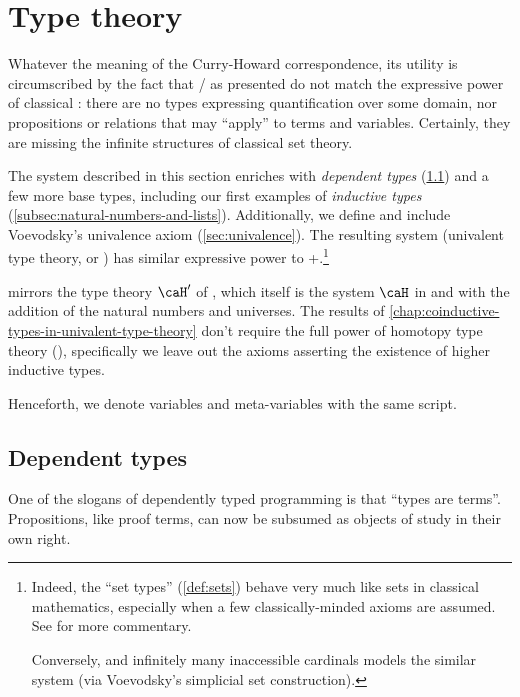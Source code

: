 \documentclass[./thesis.tex]{subfiles}
\begin{document}
\chapter{Type theory}
\label{chap:type-theory}

Whatever the meaning of the Curry-Howard correspondence, its utility is
circumscribed by the fact that \IPL{}/\TLC{} as
presented do not match the expressive power of classical \FOL{}:
there are no types expressing quantification over some domain, nor propositions
or relations that may ``apply'' to terms and variables. Certainly, they are
missing the infinite structures of classical set theory.

The system described in this section enriches \TLC{} with
\textit{dependent types} (\cref{sec:dependent-types}) and a few more base types,
including our first examples of \textit{inductive types}
(\cref{subsec:natural-numbers-and-lists}). Additionally, we define and include
Voevodsky's univalence axiom (\cref{sec:univalence}). The
resulting system (univalent type theory, or \UTT{}) has similar
expressive power to \ZFC{}+\FOL{}.\footnote{Indeed, the
  ``set types'' (\cref{def:sets}) behave very much like sets in classical
  mathematics, especially when a few classically-minded axioms are assumed. See
  \cite{book} for more commentary.

  Conversely, \ZFC{} and infinitely many inaccessible cardinals models the
  similar system \HoTT{} (via Voevodsky's simplicial set construction).}

\UTT{} mirrors the type theory $\caH'$ of \cite{homotopy-limits}, which itself
is the system $\caH$ in \cite{inductive} and \cite{homotopy-initial} with the
addition of the natural numbers and universes. The results of
\cref{chap:coinductive-types-in-univalent-type-theory} don't
require the full power of homotopy type theory (\HoTT), specifically we leave
out the axioms asserting the existence of higher inductive types.

\begin{notation}
  Henceforth, we denote variables and meta-variables with the same
  script.
\end{notation}

\section{Dependent types}
\label{sec:dependent-types}

One of the slogans of dependently typed programming is that ``types are
terms''. Propositions, like proof terms, can now be subsumed as objects of study
in their own right.
\end{document}
